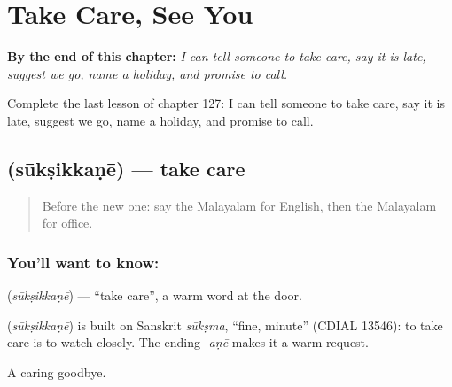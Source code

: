 
\chapter{Take Care, See You}
\label{ch:ml-take-care-see-you}

\begin{chapteropening}
\textbf{By the end of this chapter:} \emph{I can tell someone to take care, say it is late, suggest we go, name a holiday, and promise to call.}

Complete the last lesson of chapter 127: I can tell someone to take care, say it is late, suggest we go, name a holiday, and promise to call.
\end{chapteropening}

\section[\texorpdfstring{\ml{സൂക്ഷിക്കണേ} (sūkṣikkaṇē)}{സൂക്ഷിക്കണേ (sūkṣikkaṇē)}]{ (sūkṣikkaṇē) — take care}

\label{lesson:ML-C127-takecare}



\begin{quote}
Before the new one: say the Malayalam for English, then the Malayalam for office.
\end{quote}

\subsection*{You'll want to know: }
\textbf{} (\emph{sūkṣikkaṇē}) — \textquotedblleft{}take care\textquotedblright{}, a warm word at the door.

\begin{cousinweb}
\textbf{} (\emph{sūkṣikkaṇē}) is built on Sanskrit \emph{sūkṣma}, \textquotedblleft{}fine, minute\textquotedblright{} (CDIAL 13546): to take care is to watch closely. The ending \emph{-aṇē} makes it a warm request.
\end{cousinweb}

\begin{grammarlens}[title={What you've built}]
A caring goodbye.
\end{grammarlens}

